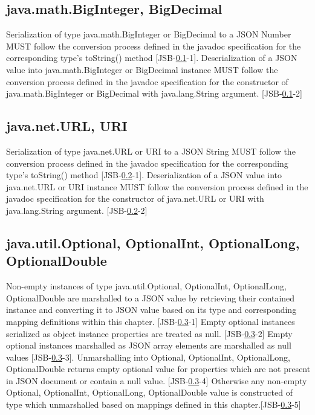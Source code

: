 \subsection{java.math.BigInteger, BigDecimal}
\label{subsec:bignumber}
Serialization of type java.math.BigInteger or BigDecimal to a JSON Number 
MUST follow the conversion process defined in the javadoc specification for the corresponding type's toString() method [JSB-\ref{subsec:bignumber}-1]. 
Deserialization of a JSON value into java.math.BigInteger or BigDecimal instance 
MUST follow the conversion process defined in the javadoc specification for the constructor of java.math.BigInteger or BigDecimal with java.lang.String argument. [JSB-\ref{subsec:bignumber}-2]

\subsection{java.net.URL, URI}
\label{subsec:url}
Serialization of type java.net.URL or URI to a JSON String 
MUST follow the conversion process defined in the javadoc specification for the corresponding type's toString() method [JSB-\ref{subsec:url}-1]. 
Deserialization of a JSON value into java.net.URL or URI instance 
MUST follow the conversion process defined in the javadoc specification for the constructor of java.net.URL or URI with java.lang.String argument. [JSB-\ref{subsec:url}-2]

\subsection{java.util.Optional, OptionalInt, OptionalLong, OptionalDouble}
\label{subsec:optional}
Non-empty instances of type java.util.Optional, OptionalInt, OptionalLong, OptionalDouble are marshalled to a JSON value by retrieving their contained instance and 
converting it to JSON value based on its type and corresponding mapping definitions within this chapter. [JSB-\ref{subsec:optional}-1] 
Empty optional instances serialized as object instance properties are treated as null. [JSB-\ref{subsec:optional}-2] 
Empty optional instances marshalled as JSON array elements are marshalled as null values [JSB-\ref{subsec:optional}-3]. 
Unmarshalling into Optional, OptionalInt, OptionalLong, OptionalDouble returns empty optional value for properties which are not present in JSON document or contain a null value. [JSB-\ref{subsec:optional}-4] 
Otherwise any non-empty Optional, OptionalInt, OptionalLong, OptionalDouble value is constructed of type which unmarshalled based on mappings defined in this chapter.[JSB-\ref{subsec:optional}-5]

